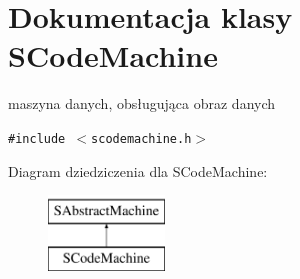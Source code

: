 \hypertarget{classSCodeMachine}{
\section{Dokumentacja klasy SCodeMachine}
\label{classSCodeMachine}
}
maszyna danych, obsługująca obraz danych  


{\tt \#include $<$scodemachine.h$>$}

Diagram dziedziczenia dla SCodeMachine:\begin{figure}[H]
\begin{center}
\leavevmode
\includegraphics[height=2cm]{classSCodeMachine}
\end{center}
\end{figure}
